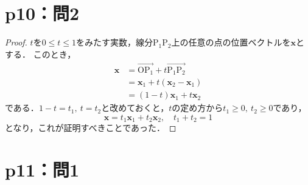 \documentclass[a4paper,10pt,fleqn]{ltjsarticle}
\begin{document}
\section*{p10：問2}

\begin{tleftbar}
  \begin{proof}
    $t$を$0 \le t \le 1$をみたす実数，線分$\mathrm{P_1 P_2}$上の任意の点の位置ベクトルを$\bm{x}$とする．
    このとき，
    \begin{align*}
      \bm{x} & = \overrightarrow{\mathrm{O P_1}}+t\overrightarrow{\mathrm{P_1 P_2}} \\
             & = \bm{x}_1 + t (\bm{x}_2 - \bm{x}_1)                                 \\
             & = (1-t) \bm{x}_1 + t \bm{x}_2
    \end{align*}
    である．$1-t = t_1,~t=t_2$と改めておくと，$t$の定め方から$t_1 \ge 0,~t_2 \ge 0$であり，
    \[
      \bm{x}= t_1 \bm{x}_1 + t_2 \bm{x}_2 ,\quad t_1 + t_2 =1
    \]
    となり，これが証明すべきことであった．
  \end{proof}
\end{tleftbar}

\newpage
\section*{p11：問1}
\end{document}
